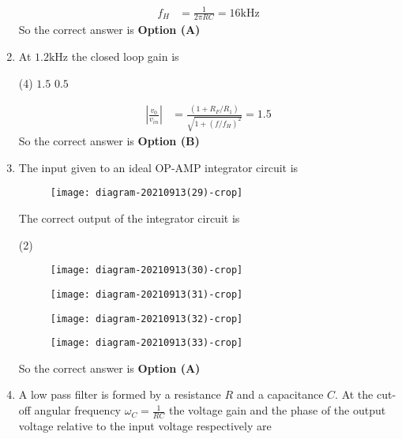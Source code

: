 \begin{enumerate}
\begin{answer}
\begin{align*}
f_{H}&=\frac{1}{2 \pi R C}=16 \mathrm{kHz}
\end{align*}
So the correct answer is \textbf{Option (A)}
\end{answer}
\item At $1.2 \mathrm{kHz}$ the closed loop gain is
{}
\begin{tasks}(4)
\task[\textbf{B.}] $1.5$
\task[\textbf{D.}]  $0.5$
\end{tasks}
\begin{answer}
\begin{align*}
\left|\frac{v_{0}}{v_{i n}}\right|&=\frac{\left(1+R_{F} / R_{1}\right)}{\sqrt{1+\left(f / f_{H}\right)^{2}}}=1.5
\end{align*}
So the correct answer is \textbf{Option (B)}
\end{answer}
	\item The input given to an ideal OP-AMP integrator circuit is\\
	\begin{figure}[H]
		\centering
		\texttt{[image: diagram-20210913(29)-crop]}
	\end{figure}
	The correct output of the integrator circuit is
{	}
\begin{tasks}(2)
\task[\textbf{A.}] \begin{figure}[H]
	\centering
	\texttt{[image: diagram-20210913(30)-crop]}
\end{figure}
\task[\textbf{B.}] \begin{figure}[H]
	\centering
	\texttt{[image: diagram-20210913(31)-crop]}
\end{figure}
\task[\textbf{C.}] \begin{figure}[H]
	\centering
	\texttt{[image: diagram-20210913(32)-crop]}
\end{figure}
\task[\textbf{D.}] \begin{figure}[H]
	\centering
	\texttt{[image: diagram-20210913(33)-crop]}
\end{figure}
\end{tasks}
\begin{answer}
So the correct answer is \textbf{Option (A)}
\end{answer}
	\item A low pass filter is formed by a resistance $R$ and a capacitance $C .$ At the cut-off angular frequency $\omega_{C}=\frac{1}{R C}$ the voltage gain and the phase of the output voltage relative to the input voltage respectively are

\end{enumerate}
